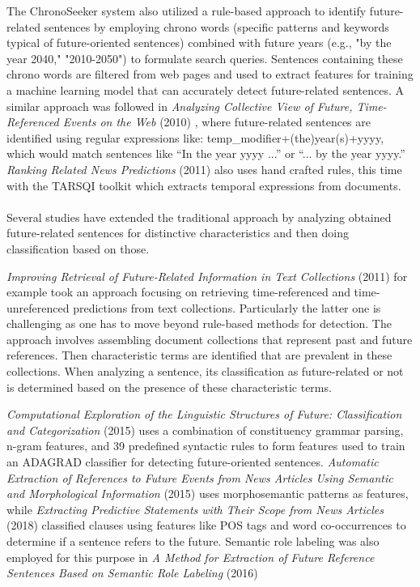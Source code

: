\documentclass[a4paper,10pt]{report} %
\begin{document}
The ChronoSeeker system \cite{KawaiChronoseeker} also utilized a rule-based approach to identify future-related sentences by employing chrono words (specific patterns and keywords typical of future-oriented sentences) combined with future years (e.g., "by the year 2040," "2010-2050") to formulate search queries. Sentences containing these chrono words are filtered from web pages and used to extract features for training a machine learning model that can accurately detect future-related sentences.
A similar approach was followed in \textit{Analyzing Collective View of Future, Time-Referenced Events on the Web} (2010) \cite{JatowtAnalyzingCollective}, where future-related sentences are identified using regular expressions like: temp\_modifier+(the)year(s)+yyyy, which would match sentences like “In the year yyyy ...” or “... by the year yyyy.” 
\textit{Ranking Related News Predictions} (2011) \cite{KanhabuaRanking} also uses hand crafted rules, this time with the TARSQI toolkit which extracts temporal expressions from documents. 
\\\\
Several studies have extended the traditional approach by analyzing obtained future-related sentences for distinctive characteristics and then doing classification based on those.

\textit{Improving Retrieval of Future-Related Information in Text Collections} (2011) \cite{KanazawaImproving} for example took an approach focusing on retrieving time-referenced and time-unreferenced predictions from text collections. Particularly the latter one is challenging as one has to move beyond rule-based methods for detection. The approach involves assembling document collections that represent past and future references. Then characteristic terms are identified that are prevalent in these collections. When analyzing a sentence, its classification as future-related or not is determined based on the presence of these characteristic terms.

\textit{Computational Exploration of the Linguistic Structures of Future: Classification and Categorization} (2015) \cite{NiComputationalExploration} uses a combination of constituency grammar parsing, n-gram features, and 39 predefined syntactic rules to form features used to train an ADAGRAD classifier for detecting future-oriented sentences. \textit{Automatic Extraction of References to Future Events from News Articles Using Semantic and Morphological Information} (2015) \cite{NakajimaAutomaticExtraction} uses morphosemantic patterns as features, while \textit{Extracting Predictive Statements with Their Scope from News Articles} (2018) \cite{YarrabellyExtractingPredictive} classified clauses using features like POS tags and word co-occurrences to determine if a sentence refers to the future. Semantic role labeling was also employed for this purpose in \textit{A Method for Extraction of Future Reference Sentences Based on Semantic Role  Labeling} (2016) \cite{NakajimaMethod} \\
\end{document}

